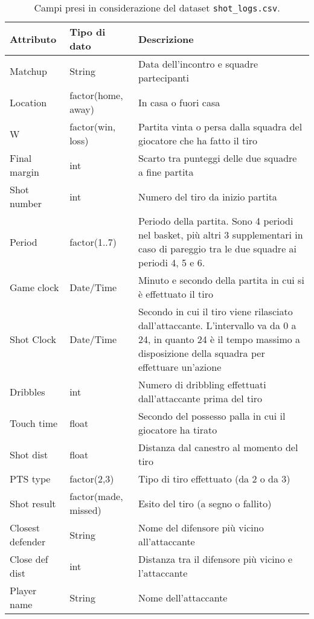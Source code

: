 \begin{center}
	\begin{longtable}[m]{|m{8em} m{7em} m{16em}|} 


		\caption{Campi presi in considerazione del dataset \texttt{shot\_logs.csv}.\label{tabella_shot_logs}}\\

		\hline
		\bfseries{Attributo} & \bfseries{Tipo di dato} & \bfseries{Descrizione} \\
		\hline
		Matchup & String & Data dell'incontro e squadre partecipanti \\
		\hline
		Location & factor(home, away) & In casa o fuori casa \\
		\hline
		W & factor(win, loss) & Partita vinta o persa dalla squadra del giocatore che ha fatto il tiro \\ 
		\hline
		Final margin & int & Scarto tra punteggi delle due squadre a fine partita \\ 
		\hline
		Shot number & int & Numero del tiro da inizio partita \\ 
		\hline
		Period & factor(1..7) & Periodo della partita. Sono 4 periodi nel basket, più altri 3 supplementari in caso di pareggio tra le due squadre ai periodi 4, 5 e 6. \\ 
		\hline
		Game clock & Date/Time & Minuto e secondo della partita in cui si è effettuato il tiro \\ 
		\hline
		Shot Clock & Date/Time & Secondo in cui il tiro viene rilasciato dall'attaccante. L'intervallo va da 0 a 24, in quanto 24 è il tempo massimo a disposizione della squadra per effettuare un'azione \\ 
		\hline
		Dribbles & int & Numero di dribbling effettuati dall'attaccante prima del tiro \\ 
		\hline
		Touch time & float & Secondo del possesso palla in cui il giocatore ha tirato \\ 
		\hline
		Shot dist & float & Distanza dal canestro al momento del tiro \\ 
		\hline
		PTS type & factor(2,3) & Tipo di tiro effettuato (da 2 o da 3) \\ 
		\hline
		Shot result & factor(made, missed) & Esito del tiro (a segno o fallito) \\ 
		\hline
		Closest defender & String & Nome del difensore più vicino all'attaccante \\ 
		\hline
		Close def dist & int & Distanza tra il difensore più vicino e l'attaccante \\ 
		\hline
		Player name & String & Nome dell'attaccante \\ 
		\hline
	\end{longtable}
\end{center}

